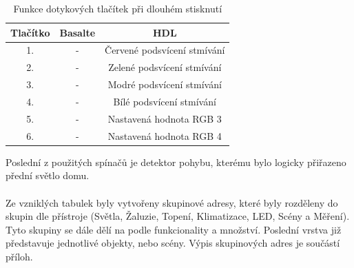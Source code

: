 \begin{table}[h]
 \caption[Funkce dotykových tlačítek při dlouhém stisknutí]{Funkce dotykových tlačítek při dlouhém stisknutí}
   \small
    \centering
	  \begin{tabular}{|c|c|c|}
	    \hline
	    Tlačítko & Basalte & HDL  \\
	    \hline\hline
	    1. & - & Červené podsvícení stmívání  \\
	    \hline
        2. & - & Zelené podsvícení stmívání \\
	    \hline
        3. & - & Modré podsvícení stmívání  \\
	    \hline
        4. & - & Bílé podsvícení  stmívání \\
	    \hline
        5. & - & Nastavená hodnota RGB 3 \\
	    \hline 
        6. & - & Nastavená hodnota RGB 4 \\
	    \hline 
	  \end{tabular}
\end{table}

Poslední z použitých spínačů je detektor pohybu, kterému bylo logicky přiřazeno přední světlo domu.\\ \\Ze vzniklých tabulek byly vytvořeny skupinové adresy, které byly rozděleny do skupin dle přístroje (Světla, Žaluzie, Topení, Klimatizace, LED, Scény a Měření). Tyto skupiny se dále dělí na podle funkcionality a množství. Poslední vrstva již představuje jednotlivé objekty, nebo scény. Výpis skupinových adres je součástí příloh.